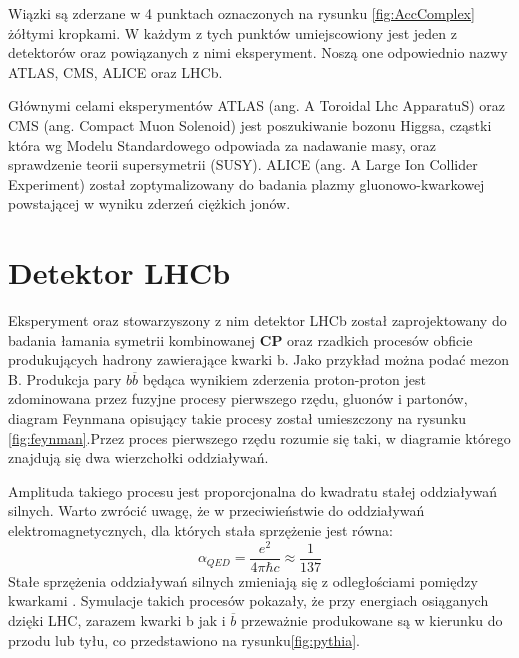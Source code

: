 Wiązki są zderzane w 4 punktach oznaczonych na rysunku \ref{fig:AccComplex} żółtymi kropkami. W każdym z tych punktów umiejscowiony jest jeden z detektorów oraz powiązanych z nimi eksperyment. Noszą one odpowiednio nazwy ATLAS, CMS, ALICE oraz LHCb.

Głównymi celami eksperymentów ATLAS (ang. A Toroidal Lhc ApparatuS)\cite{ATLAS} oraz CMS (ang. Compact Muon Solenoid) \cite{CMS} jest poszukiwanie bozonu Higgsa, cząstki która wg Modelu Standardowego odpowiada za nadawanie masy, oraz sprawdzenie teorii supersymetrii (SUSY). ALICE (ang. A Large Ion Collider Experiment)\cite{ALICE} został zoptymalizowany do badania plazmy gluonowo-kwarkowej powstającej w wyniku zderzeń ciężkich jonów.


\section{Detektor LHCb}
Eksperyment oraz stowarzyszony z nim detektor LHCb został zaprojektowany do badania łamania symetrii kombinowanej \textbf{CP} oraz rzadkich procesów obficie produkujących hadrony zawierające kwarki b. Jako przykład można podać mezon B. Produkcja pary $b\overline{b}$ będąca wynikiem zderzenia proton-proton jest zdominowana przez fuzyjne procesy pierwszego rzędu,  gluonów i partonów, diagram Feynmana opisujący takie procesy został umieszczony na rysunku \ref{fig:feynman}.Przez proces pierwszego rzędu rozumie się taki, w diagramie którego znajdują się dwa wierzchołki oddziaływań.

 Amplituda takiego procesu jest proporcjonalna do kwadratu stałej oddziaływań silnych. Warto zwrócić uwagę, że w przeciwieństwie do oddziaływań elektromagnetycznych, dla których stała sprzężenie jest równa:
 \begin{equation}
 \alpha_{QED}=\frac{e^2}{4\pi \hbar c}\approx \frac{1}{137} 
 \end{equation}
Stałe sprzężenia oddziaływań silnych zmieniają się z odległościami pomiędzy kwarkami \cite{perkins}. Symulacje takich procesów pokazały, że przy energiach osiąganych dzięki LHC, zarazem kwarki b jak i  $\overline{b}$ przeważnie produkowane są w kierunku do przodu lub tyłu, co przedstawiono na rysunku\ref{fig:pythia}.  


